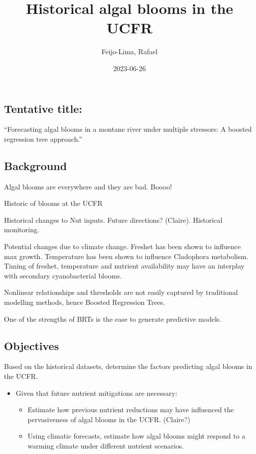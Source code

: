 \documentclass[
]{article}
\title{Historical algal blooms in the UCFR}
\author{Feijo-Lima, Rafael}
\date{2023-06-26}
\providecommand{\tightlist}{%
  \setlength{\itemsep}{0pt}\setlength{\parskip}{0pt}}
\begin{document}
\maketitle

\hypertarget{tentative-title}{%
\subsection{Tentative title:}\label{tentative-title}}

``Forecasting algal blooms in a montane river under multiple stressors:
A boosted regression tree approach.''

\hypertarget{background}{%
\subsection{Background}\label{background}}

Algal blooms are everywhere and they are bad. Boooo!

Historic of blooms at the UCFR

Historical changes to Nut inputs. Future directions? (Claire).
Historical monitoring.

Potential changes due to climate change. Freshet has been shown to
influence max growth. Temperature has been shown to influence Cladophora
metabolism. Timing of freshet, temperature and nutrient availability may
have an interplay with secondary cyanobacterial blooms.

Nonlinear relationships and thresholds are not easily captured by
traditional modelling methods, hence Boosted Regression Trees.

One of the strengths of BRTs is the ease to generate predictive models.

\hypertarget{objectives}{%
\subsection{Objectives}\label{objectives}}

Based on the historical datasets, determine the factors predicting algal
blooms in the UCFR.

\begin{itemize}
\tightlist
\item
  Given that future nutrient mitigations are necessary:

  \begin{itemize}
  \tightlist
  \item
    Estimate how previous nutrient reductions may have influenced the
    pervasiveness of algal blooms in the UCFR. (Claire?)
  \item
    Using climatic forecasts, estimate how algal blooms might respond to
    a warming climate under different nutrient scenarios.
  \end{itemize}
\end{itemize}
\end{document}
